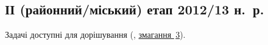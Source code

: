 \renewenvironment{problemAllDefault}[1]{\vspace{10mm}\par\begin{problem}{#1}{Клавіатура (stdin)}{Екран (stdout)}{1 сек}{64 мегабайти}}{\end{problem}}

\subsection{ІІ (районний/міський) етап 2012/13 н.~р.}

Задачі доступні для дорішування (\EjudgeCkipoName, \href{https://ejudge.ckipo.edu.ua/cgi-bin/new-register?contest_id=3}{змагання \textnumero$\,$3}).

	

	

	

	


